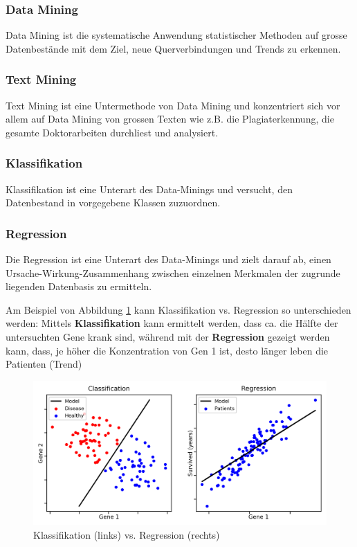 \documentclass[a4paper, 11pt, nofootinbib]{article}
\begin{document}
\subsubsection{Data Mining}
 Data Mining ist die systematische Anwendung statistischer Methoden auf grosse Datenbestände mit dem Ziel, neue Querverbindungen und Trends zu erkennen.

\subsubsection{Text Mining}
 Text Mining ist eine Untermethode von Data Mining und konzentriert sich vor allem auf Data Mining von grossen Texten wie z.B. die Plagiaterkennung, die gesamte Doktorarbeiten durchliest und analysiert.
 
 \subsubsection{Klassifikation}
 Klassifikation ist eine Unterart des Data-Minings und versucht, den Datenbestand in vorgegebene Klassen zuzuordnen.
 
 \subsubsection{Regression}
 Die Regression ist eine Unterart des Data-Minings und zielt darauf ab, einen Ursache-Wirkung-Zusammenhang zwischen einzelnen Merkmalen der zugrunde liegenden Datenbasis zu ermitteln. 
 
 Am Beispiel von Abbildung \ref{fig:regclass} kann Klassifikation vs. Regression so unterschieden werden: Mittels \textbf{Klassifikation} kann ermittelt werden, dass ca. die Hälfte der untersuchten Gene krank sind, während mit der \textbf{Regression} gezeigt werden kann, dass, je höher die Konzentration von Gen 1 ist, desto länger leben die Patienten (Trend)
 
 \begin{figure}[htb]
 	\centering
 	\includegraphics[keepaspectratio=true,height=15\baselineskip]{regressionvsclassification.png}
 	\caption{Klassifikation (links) vs. Regression (rechts)}
 	\label{fig:regclass}
 \end{figure}
\end{document}
